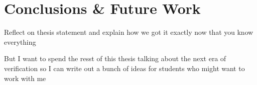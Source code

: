 \chapter{Conclusions \& Future Work}

Reflect on thesis statement and explain how we got it exactly now that you know everything

But I want to spend the resst of this thesis talking about the next era of verification so I can write out a bunch of ideas for students who might want to work with me



